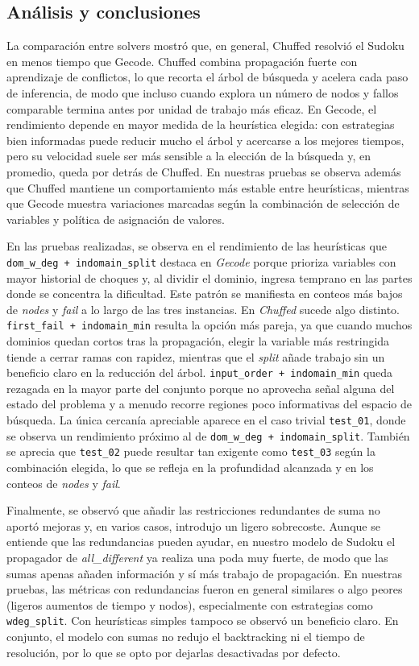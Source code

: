 
\subsection{Análisis y conclusiones}\label{sec:01-sudoku-analisis-y-conclusiones}
La comparación entre solvers mostró que, en general, Chuffed resolvió el Sudoku en menos tiempo que Gecode. Chuffed combina propagación fuerte con aprendizaje de conflictos, lo que recorta el árbol de búsqueda y acelera cada paso de inferencia, de modo que incluso cuando explora un número de nodos y fallos comparable  termina antes por unidad de trabajo más eficaz. En Gecode, el rendimiento depende en mayor medida de la heurística elegida: con estrategias bien informadas puede reducir mucho el árbol y acercarse a los mejores tiempos, pero su velocidad suele ser más sensible a la elección de la búsqueda y, en promedio, queda por detrás de Chuffed. En nuestras pruebas se observa además que Chuffed mantiene un comportamiento más estable entre heurísticas, mientras que Gecode muestra variaciones marcadas según la combinación de selección de variables y política de asignación de valores.

En las pruebas realizadas, se observa en el rendimiento de las heurísticas que \texttt{dom\_w\_deg + indomain\_split} destaca en \textit{Gecode} porque prioriza variables con mayor historial de choques y, al dividir el dominio, ingresa temprano en las partes donde se concentra la dificultad. Este patrón se manifiesta en conteos más bajos de \emph{nodes} y \emph{fail} a lo largo de las tres instancias. En \textit{Chuffed} sucede algo distinto. \texttt{first\_fail + indomain\_min} resulta la opción más pareja, ya que cuando muchos dominios quedan cortos tras la propagación, elegir la variable más restringida tiende a cerrar ramas con rapidez, mientras que el \emph{split} añade trabajo sin un beneficio claro en la reducción del árbol. \texttt{input\_order + indomain\_min} queda rezagada en la mayor parte del conjunto porque no aprovecha señal alguna del estado del problema y a menudo recorre regiones poco informativas del espacio de búsqueda. La única cercanía apreciable aparece en el caso trivial \texttt{test\_01}, donde se observa un rendimiento próximo al de \texttt{dom\_w\_deg + indomain\_split}. También se aprecia que \texttt{test\_02} puede resultar tan exigente como \texttt{test\_03} según la combinación elegida, lo que se refleja en la profundidad alcanzada y en los conteos de \emph{nodes} y \emph{fail}.

Finalmente, se observó que añadir las restricciones redundantes de suma no aportó mejoras y, en varios casos, introdujo un ligero sobrecoste. Aunque se entiende que las redundancias pueden ayudar, en nuestro modelo de Sudoku el propagador de \textit{all\_different} ya realiza una poda muy fuerte, de modo que las sumas apenas añaden información y sí más trabajo de propagación. En nuestras pruebas, las métricas con redundancias fueron en general similares o algo peores (ligeros aumentos de tiempo y nodos), especialmente con estrategias como \texttt{wdeg\_split}. Con heurísticas simples tampoco se observó un beneficio claro. En conjunto, el modelo con sumas no redujo el backtracking ni el tiempo de resolución, por lo que se opto por dejarlas desactivadas por defecto.